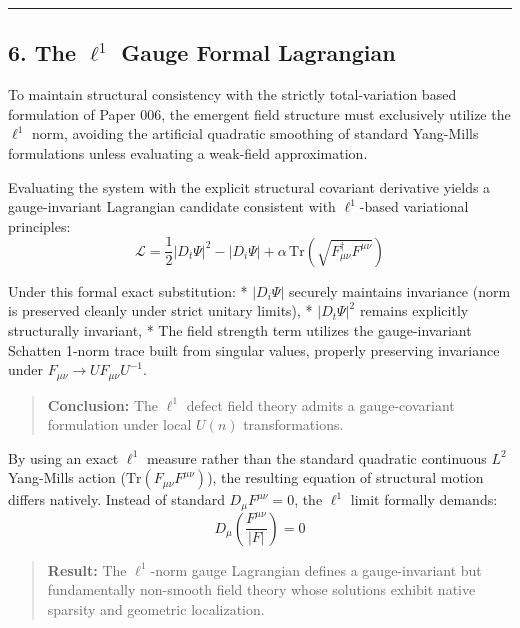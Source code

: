 \documentclass[
]{article}
\begin{document}
\begin{center}\rule{0.5\linewidth}{0.5pt}\end{center}

\subsection{\texorpdfstring{6. The \(\ell^1\) Gauge Formal
Lagrangian}{6. The \textbackslash ell\^{}1 Gauge Formal Lagrangian}}\label{the-ell1-gauge-formal-lagrangian}

To maintain structural consistency with the strictly total-variation
based formulation of Paper 006, the emergent field structure must
exclusively utilize the \(\ell^1\) norm, avoiding the artificial
quadratic smoothing of standard Yang-Mills formulations unless
evaluating a weak-field approximation.

Evaluating the system with the explicit structural covariant derivative
yields a gauge-invariant Lagrangian candidate consistent with
\(\ell^1\)-based variational principles:
\[ \mathcal{L} = \frac{1}{2} |D_t \Psi|^2 - |D_i \Psi| + \alpha \, \mathrm{Tr}(\sqrt{F_{\mu\nu}^\dagger F^{\mu\nu}}) \]

Under this formal exact substitution: * \(|D_i \Psi|\) securely
maintains invariance (norm is preserved cleanly under strict unitary
limits), * \(|D_t \Psi|^2\) remains explicitly structurally invariant, *
The field strength term utilizes the gauge-invariant Schatten 1-norm
trace built from singular values, properly preserving invariance under
\(F_{\mu\nu} \rightarrow U F_{\mu\nu} U^{-1}\).

\begin{quote}
\textbf{Conclusion:} The \(\ell^1\) defect field theory admits a
gauge-covariant formulation under local \(U(n)\) transformations.
\end{quote}

By using an exact \(\ell^1\) measure rather than the standard quadratic
continuous \(L^2\) Yang-Mills action
(\(\mathrm{Tr}(F_{\mu\nu} F^{\mu\nu})\)), the resulting equation of
structural motion differs natively. Instead of standard
\(D_\mu F^{\mu\nu} = 0\), the \(\ell^1\) limit formally demands:
\[ D_\mu \left( \frac{F^{\mu\nu}}{|F|} \right) = 0 \]

\begin{quote}
\textbf{Result:} The \(\ell^1\)-norm gauge Lagrangian defines a
gauge-invariant but fundamentally non-smooth field theory whose
solutions exhibit native sparsity and geometric localization.
\end{quote}
\end{document}
